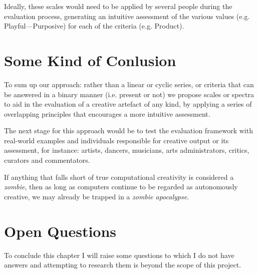Ideally, these scales would need to be applied by several people during the evaluation process, generating an intuitive assessment of the various values (e.g. Playful---Purposive) for each of the criteria (e.g. Product).


\section{Some Kind of Conlusion}



To sum up our approach: rather than a linear or cyclic series, or criteria that can be answered in a binary manner (i.e. present or not) we propose scales or spectra to aid in the evaluation of a creative artefact of any kind, by applying a series of overlapping principles that encourages a more intuitive assessment.

The next stage for this approach would be to test the evaluation framework with real-world examples and individuals responsible for creative output or its assessment, for instance: artists, dancers, musicians, arts administrators, critics, curators and commentators.

If anything that falls short of true computational creativity is considered a \textit{zombie}, then as long as computers continue to be regarded as autonomously creative, we may already be trapped in a \textit{zombie apocalypse}.


\section{Open Questions}

To conclude this chapter I will raise some questions to which I do not have answers and attempting to research them is beyond the scope of this project.


